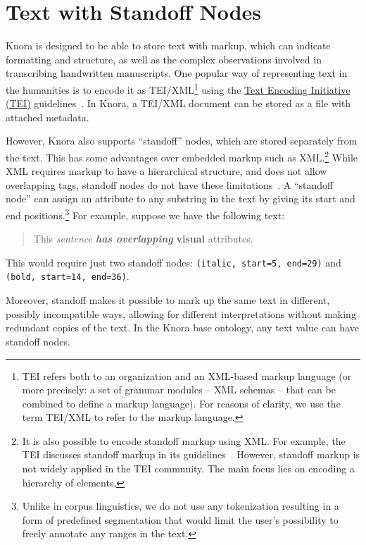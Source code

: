\documentclass[12pt, a4paper]{article}
\begin{document}
\section{Text with Standoff Nodes}

\label{sec:standoff}

Knora is designed to be able to store text with markup, which can indicate formatting and structure, as well as the complex observations involved in transcribing handwritten manuscripts. One popular way of representing text in the humanities is to encode it as TEI/XML\footnote{TEI refers both to an organization and an XML-based markup language (or more precisely: a set of grammar modules -- XML schemas -- that can be combined to define a markup language). For reasons of clarity, we use the term TEI/XML to refer to the markup language.} using the \href{http://www.tei-c.org/index.xml}{Text Encoding Initiative (TEI)} guidelines~\cite{P5}. In Knora, a TEI/XML document can be stored as a file with attached metadata.

However, Knora also supports \enquote{standoff} nodes, which are stored separately from the text. This has some advantages over embedded markup such as XML.\footnote{It is also possible to encode standoff markup using XML. For example, the TEI discusses standoff markup in its guidelines~\cite[chapters 16.9 and 20.4]{P5}. However, standoff markup is not widely applied in the TEI community. The main focus lies on encoding a hierarchy of elements.} While XML requires markup to have a hierarchical structure, and does not allow overlapping tags, standoff nodes do not have these limitations~\cite{Schmidt_Standoff}. A \enquote{standoff node} can assign an attribute to any substring in the text by giving its start and end positions.\footnote{Unlike in corpus linguistics, we do not use any tokenization resulting in a form of predefined segmentation that would limit the user's possibility to freely annotate any ranges in the text.} For example, suppose we have the following text:

\begin{quote}
This \textit{sentence \textbf{has overlapping}}\textbf{ visual} attributes.
\end{quote}

This would require just two standoff nodes: \texttt{(italic, start=5, end=29)} and \texttt{(bold, start=14, end=36)}.

Moreover, standoff makes it possible to mark up the same text in different, possibly incompatible ways, allowing for different interpretations without making redundant copies of the text. In the Knora base ontology, any text value can have standoff nodes.
\end{document}
